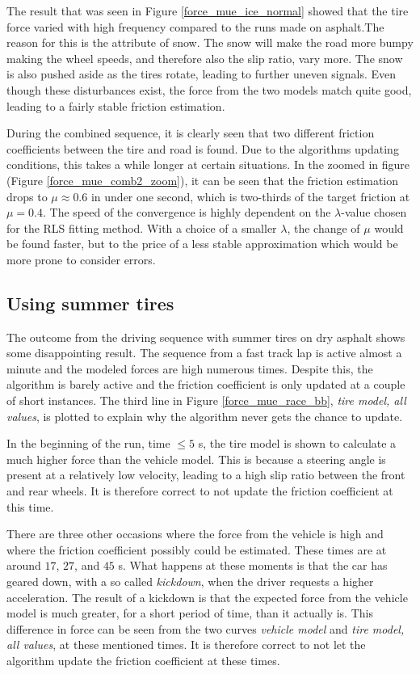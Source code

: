 The result that was seen in Figure \ref{force_mue_ice_normal} showed that the tire force varied with high frequency compared to the runs made on asphalt.The reason for this is the attribute of snow. The snow will make the road more bumpy making the wheel speeds, and therefore also the slip ratio, vary more. The snow is also pushed aside as the tires rotate, leading to further uneven signals. Even though these disturbances exist, the force from the two models match quite good, leading to a fairly stable friction estimation. 

During the combined sequence, it is clearly seen that two different friction coefficients between the tire and road is found. Due to the algorithms updating conditions, this takes a while longer at certain situations. In the zoomed in figure (Figure \ref{force_mue_comb2_zoom}), it can be seen that the friction estimation drops to $ \mu \approx 0.6 $ in under one second, which is two-thirds of the target friction at $ \mu = 0.4 $. The speed of the convergence is highly dependent on the $ \lambda $-value chosen for the RLS fitting method. With a choice of a smaller $ \lambda $, the change of $ \mu $ would be found faster, but to the price of a less stable approximation which would be more prone to consider errors. 

\subsection{Using summer tires}
The outcome from the driving sequence with summer tires on dry asphalt shows some disappointing result. The sequence from a fast track lap is active almost a minute and the modeled forces are high numerous times. Despite this, the algorithm is barely active and the friction coefficient is only updated at a couple of short instances. The third line in Figure \ref{force_mue_race_bb}, \textit{tire model, all values}, is plotted to explain why the algorithm never gets the chance to update.

In the beginning of the run, time $ \leq 5 $ s, the tire model is shown to calculate a much higher force than the vehicle model. This is because a steering angle is present at a relatively low velocity, leading to a high slip ratio between the front and rear wheels. It is therefore correct to not update the friction coefficient at this time. 

There are three other occasions where the force from the vehicle is high and where the friction coefficient possibly could be estimated. These times are at around $ 17 $, $ 27 $, and $ 45 $ s. What happens at these moments is that the car has geared down, with a so called \textit{kickdown}, when the driver requests a higher acceleration. The result of a kickdown is that the expected force from the vehicle model is much greater, for a short period of time, than it actually is. This difference in force can be seen from the two curves \textit{vehicle model} and \textit{tire model, all values}, at these mentioned times. It is therefore correct to not let the algorithm update the friction coefficient at these times.

